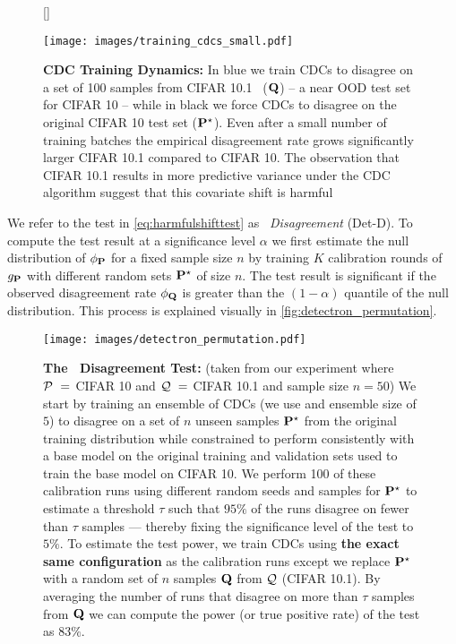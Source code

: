 \begin{figure}[!htb]
    [\FBwidth]
    {\caption{\small \textbf{CDC Training Dynamics:} In blue we train CDCs to disagree on a set of 100 samples from CIFAR 10.1~\citep{cifar101} ($\mathbf{Q}$) -- a near OOD test set for CIFAR 10 -- while in black
    we force CDCs to disagree on the original CIFAR 10 test set ($\mathbf{P}^\star$).
    Even after a small number of training batches the empirical disagreement rate grows significantly larger CIFAR 10.1 compared to CIFAR 10.
    The observation that CIFAR 10.1 results in more predictive variance under the CDC algorithm suggest that this covariate shift is harmful}
    \label{fig:harmfulshift}}
    {\texttt{[image: images/training\_cdcs\_small.pdf]}}
\end{figure}
We refer to the test in \autoref{eq:harmfulshifttest} as \textit{\method\ Disagreement} (Det-D).
To compute the test result at a significance level $\alpha$ we first estimate the null distribution of $\phi_{\mathbf{P}}$ for a fixed sample size $n$ by training $K$ calibration rounds of $g_{\mathbf{P}}$ with different random sets $\mathbf{P}^\star$ of size $n$.
The test result is significant if the observed disagreement rate $\phi_{\mathbf{Q}}$ is greater than the $(1-\alpha)$ quantile of the null distribution.
This process is explained visually in \autoref{fig:detectron_permutation}.

\begin{figure}[!htb]
    \centering
    \texttt{[image: images/detectron\_permutation.pdf]}
    \caption{\small \textbf{The \method\ Disagreement Test:} (taken from our experiment where $\mathcal{P}\ =\ $CIFAR 10 and $\mathcal{Q}\ =\ $CIFAR 10.1 and sample size $n=50$) We start by
    training an ensemble of CDCs (we use and ensemble size of $5$) to disagree on a set of $n$ unseen samples $\mathbf{P}^\star$ from the original training distribution
    while constrained to perform consistently with a base model on the original training and validation sets used to train the base model on CIFAR 10.
    We perform 100 of these calibration runs using different random seeds and samples for $\mathbf{P}^\star$ to estimate a threshold $\tau$ such that $95\%$
        of the runs disagree on fewer than $\tau$ samples --- thereby fixing the significance level of the test to $5\%$.
        To estimate the test power, we train CDCs using \textbf{the exact same configuration} as the calibration runs except we replace $\mathbf{P}^\star$ with a random set of $n$ samples $\mathbf{Q}$ from $\mathcal{Q}$ (CIFAR 10.1).
        By averaging the number of runs that disagree on more than $\tau$ samples from $\mathbf{Q}$ we can compute the power (or true positive rate) of the test as $83\%$.}
    \label{fig:detectron_permutation}
\end{figure}

